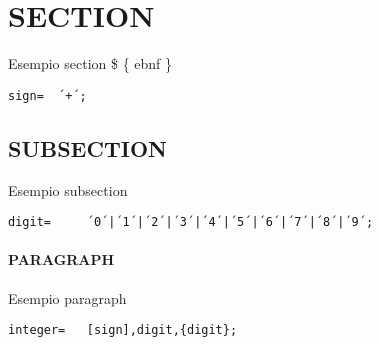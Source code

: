 \documentclass{article}
\begin{document}
    
    \section{SECTION}
      		 
    Esempio section \$ \{ ebnf \} 
    
    \begin{lstlisting}[mathescape=true]
     sign= 	´+´;
    \end{lstlisting}
    
    
    \subsection{SUBSECTION}
    
    Esempio subsection 
    
    \begin{lstlisting}[mathescape=true]
     digit= 	´0´|´1´|´2´|´3´|´4´|´5´|´6´|´7´|´8´|´9´;
    \end{lstlisting}
    
    
    \paragraph{PARAGRAPH}
    
    Esempio paragraph 
    
    \begin{lstlisting}[mathescape=true]
     integer= 	[sign],digit,{digit};
    \end{lstlisting}
    
\end{document}
